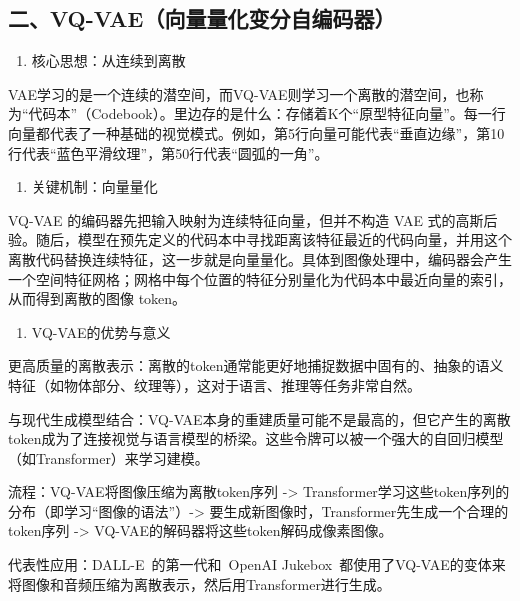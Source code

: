 \hypertarget{ux4e8cvq-vaeux5411ux91cfux91cfux5316ux53d8ux5206ux81eaux7f16ux7801ux5668}{%
\subsection{二、VQ-VAE（向量量化变分自编码器）}\label{ux4e8cvq-vaeux5411ux91cfux91cfux5316ux53d8ux5206ux81eaux7f16ux7801ux5668}}

\begin{enumerate}
\def\labelenumi{\arabic{enumi}.}
\tightlist
\item
  核心思想：从连续到离散
\end{enumerate}

VAE学习的是一个连续的潜空间，而VQ-VAE则学习一个离散的潜空间，也称为``代码本''（Codebook）。里边存的是什么：存储着K个``原型特征向量''。每一行向量都代表了一种基础的视觉模式。例如，第5行向量可能代表``垂直边缘''，第10行代表``蓝色平滑纹理''，第50行代表``圆弧的一角''。

\begin{enumerate}
\def\labelenumi{\arabic{enumi}.}
\setcounter{enumi}{1}
\tightlist
\item
  关键机制：向量量化
\end{enumerate}

VQ-VAE 的编码器先把输入映射为连续特征向量，但并不构造 VAE 式的高斯后验。随后，模型在预先定义的代码本中寻找距离该特征最近的代码向量，并用这个离散代码替换连续特征，这一步就是向量量化。具体到图像处理中，编码器会产生一个空间特征网格；网格中每个位置的特征分别量化为代码本中最近向量的索引，从而得到离散的图像 token。

\begin{enumerate}
\def\labelenumi{\arabic{enumi}.}
\setcounter{enumi}{2}
\tightlist
\item
  VQ-VAE的优势与意义
\end{enumerate}

更高质量的离散表示：离散的token通常能更好地捕捉数据中固有的、抽象的语义特征（如物体部分、纹理等），这对于语言、推理等任务非常自然。

与现代生成模型结合：VQ-VAE本身的重建质量可能不是最高的，但它产生的离散token成为了连接视觉与语言模型的桥梁。这些令牌可以被一个强大的自回归模型（如Transformer）来学习建模。

流程：VQ-VAE将图像压缩为离散token序列 -\textgreater{} Transformer学习这些token序列的分布（即学习``图像的语法''）-\textgreater{} 要生成新图像时，Transformer先生成一个合理的token序列 -\textgreater{} VQ-VAE的解码器将这些token解码成像素图像。

代表性应用：DALL-E~的第一代和~OpenAI Jukebox~都使用了VQ-VAE的变体来将图像和音频压缩为离散表示，然后用Transformer进行生成。

